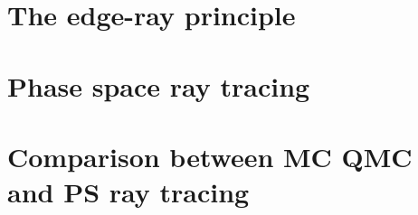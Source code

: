 %
\section{The edge-ray principle}


\section{Phase space ray tracing}

\section{Comparison between MC QMC and PS ray tracing}